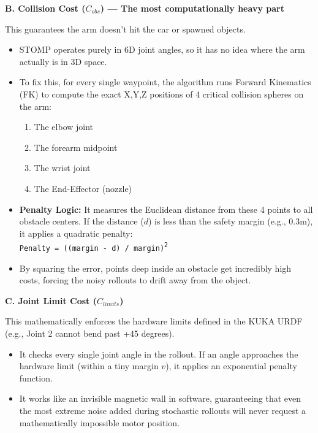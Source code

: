 \documentclass[11pt, a4paper]{article}
\begin{document}
\vspace{0.2cm}
\textbf{B. Collision Cost ($C_{obs}$) — The most computationally heavy part}

This guarantees the arm doesn't hit the car or spawned objects.

\begin{itemize}
    \item STOMP operates purely in 6D joint angles, so it has no idea where the arm actually is in 3D space.
    \item To fix this, for every single waypoint, the algorithm runs Forward Kinematics (FK) to compute the exact X,Y,Z positions of 4 critical collision spheres on the arm:
    \begin{enumerate}
        \item The elbow joint
        \item The forearm midpoint
        \item The wrist joint
        \item The End-Effector (nozzle)
    \end{enumerate}
    \item \textbf{Penalty Logic:} It measures the Euclidean distance from these 4 points to all obstacle centers. If the distance ($d$) is less than the safety margin (e.g., 0.3m), it applies a quadratic penalty: \\
    \texttt{Penalty = ((margin - d) / margin)\textsuperscript{2}}
    \item By squaring the error, points deep inside an obstacle get incredibly high costs, forcing the noisy rollouts to drift away from the object.
\end{itemize}

\vspace{0.2cm}
\textbf{C. Joint Limit Cost ($C_{limits}$)}

This mathematically enforces the hardware limits defined in the KUKA URDF (e.g., Joint 2 cannot bend past +45 degrees).

\begin{itemize}
    \item It checks every single joint angle in the rollout. If an angle approaches the hardware limit (within a tiny margin $v$), it applies an exponential penalty function.
    \item It works like an invisible magnetic wall in software, guaranteeing that even the most extreme noise added during stochastic rollouts will never request a mathematically impossible motor position.
\end{itemize}
\end{document}
